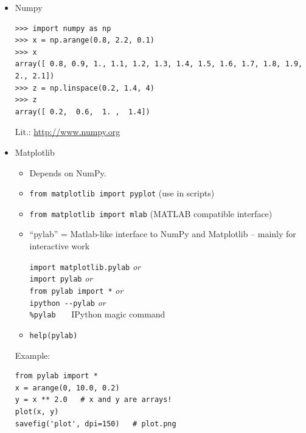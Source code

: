 \documentclass[9pt,a4wide]{extarticle}
\begin{document}
\begin{itemize}

\item Numpy

\begin{verbatim}
>>> import numpy as np
>>> x = np.arange(0.8, 2.2, 0.1)
>>> x
array([ 0.8, 0.9, 1., 1.1, 1.2, 1.3, 1.4, 1.5, 1.6, 1.7, 1.8, 1.9, 2., 2.1])
>>> z = np.linspace(0.2, 1.4, 4)
>>> z
array([ 0.2,  0.6,  1. ,  1.4])
\end{verbatim}

Lit.: \url{http://www.numpy.org}

\item Matplotlib

   \begin{itemize}

   \item Depends on NumPy.

   \item {\tt from matplotlib import pyplot} (use in scripts)

   \item {\tt from matplotlib import mlab} (MATLAB compatible interface)

   \item "`pylab"' = Matlab-like interface to NumPy and Matplotlib -- mainly for 
      interactive work

      {\tt import matplotlib.pylab} {\em or} \\
      {\tt import pylab} {\em or} \\
      {\tt from pylab import *} {\em or} \\
      {\tt ipython -{}-pylab} {\em or} \\
      {\tt \%pylab} \ \ \ IPython magic command

   \item \texttt{help(pylab)}

   \end{itemize}

Example:

\begin{minipage}[b]{.4\textwidth}
\begin{verbatim}
from pylab import *
x = arange(0, 10.0, 0.2)
y = x ** 2.0   # x and y are arrays!
plot(x, y)
savefig('plot', dpi=150)   # plot.png
\end{verbatim}

\vskip 1cm


\end{minipage}
\end{itemize}
\end{document}
